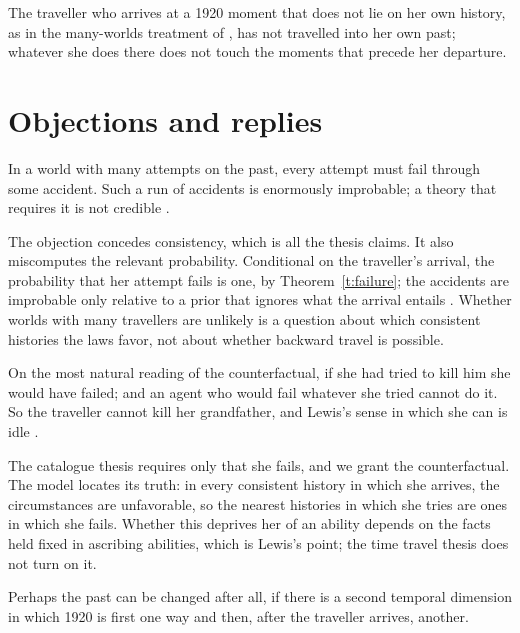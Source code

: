 \documentclass{situationist-preprint}
\begin{document}
The traveller who arrives at a 1920 moment that does not lie on her own history, as in the many-worlds treatment of \citet{Deutsch1991}, has not travelled into her own past; whatever she does there does not touch the moments that precede her departure.

\section{Objections and replies}

\begin{objection}
In a world with many attempts on the past, every attempt must fail through some accident. Such a run of accidents is enormously improbable; a theory that requires it is not credible \citep{Horwich1987}.
\end{objection}

\begin{reply}
The objection concedes consistency, which is all the thesis claims. It also miscomputes the relevant probability. Conditional on the traveller's arrival, the probability that her attempt fails is one, by Theorem~\ref{t:failure}; the accidents are improbable only relative to a prior that ignores what the arrival entails \citep{Smith1997}. Whether worlds with many travellers are unlikely is a question about which consistent histories the laws favor, not about whether backward travel is possible.
\end{reply}

\begin{objection}
On the most natural reading of the counterfactual, if she had tried to kill him she would have failed; and an agent who would fail whatever she tried cannot do it. So the traveller cannot kill her grandfather, and Lewis's sense in which she can is idle \citep{Vihvelin1996}.
\end{objection}

\begin{reply}
The catalogue thesis requires only that she fails, and we grant the counterfactual. The model locates its truth: in every consistent history in which she arrives, the circumstances are unfavorable, so the nearest histories in which she tries are ones in which she fails. Whether this deprives her of an ability depends on the facts held fixed in ascribing abilities, which is Lewis's point; the time travel thesis does not turn on it.
\end{reply}

\begin{objection}[Hypertime]
Perhaps the past can be changed after all, if there is a second temporal dimension in which 1920 is first one way and then, after the traveller arrives, another.
\end{objection}
\end{document}
